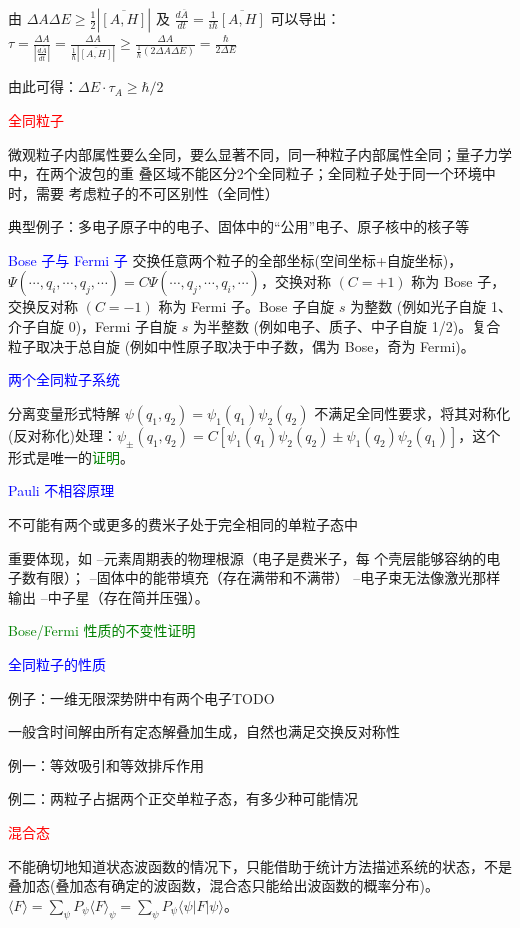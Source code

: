 \documentclass[a4paper,8pt]{extarticle} %
\newcommand{\bluetext}[1]{\textcolor{blue}{#1}}
\newcommand{\redtext}[1]{\textcolor{red}{#1}}
\newcommand{\greentext}[1]{\textcolor{green}{#1}}
\begin{document}
\begin{multicols}{3}
由 $\Delta A\Delta E \geq \frac{1}{2}|\overline{[A,H]}|$ 及 $\frac{d\overline{A}}{dt}=\frac{1}{i\hbar}\overline{[A,H]}$ 可以导出：
$\tau = \frac{\Delta A}{|\frac{d\overline{A}}{dt}|} = \frac{\Delta A}{\frac{1}{\hbar}|\overline{[A,H]}|} \geq \frac{\Delta A}{\frac{1}{\hbar}(2\Delta A\Delta E)} = \frac{\hbar}{2\Delta E}$

由此可得：$\Delta E \cdot \tau_A \geq \hbar/2$

\redtext{全同粒子}

微观粒子内部属性要么全同，要么显著不同，同一种粒子内部属性全同；量子力学中，在两个波包的重
叠区域不能区分2个全同粒子；全同粒子处于同一个环境中时，需要
考虑粒子的不可区别性（全同性）

典型例子：多电子原子中的电子、固体中的“公用”电子、原子核中的核子等

\bluetext{Bose 子与 Fermi 子}
交换任意两个粒子的全部坐标(空间坐标+自旋坐标)，$\Psi(\cdots,q_i,\cdots,q_j,\cdots)=C\Psi(\cdots,q_j,\cdots,q_i,\cdots)$，交换对称 $(C=+1)$ 称为 Bose 子，交换反对称 $(C=-1)$ 称为 Fermi 子。Bose 子自旋 $s$ 为整数 (例如光子自旋 1、介子自旋 0)，Fermi 子自旋 $s$ 为半整数 (例如电子、质子、中子自旋 1/2)。复合粒子取决于总自旋 (例如中性原子取决于中子数，偶为 Bose，奇为 Fermi)。

\bluetext{两个全同粒子系统}

分离变量形式特解 $\psi(q_1,q_2) = \psi_1(q_1)\psi_2(q_2)$ 不满足全同性要求，将其对称化(反对称化)处理：$\psi_{\pm}(q_1,q_2) = C[\psi_1(q_1)\psi_2(q_2) \pm \psi_1(q_2)\psi_2(q_1)]$，这个形式是唯一的\greentext{证明}。

\bluetext{Pauli 不相容原理}

不可能有两个或更多的费米子处于完全相同的单粒子态中

重要体现，如
–元素周期表的物理根源（电子是费米子，每
个壳层能够容纳的电子数有限）；
–固体中的能带填充（存在满带和不满带）
–电子束无法像激光那样输出
–中子星（存在简并压强）。

\greentext{Bose/Fermi 性质的不变性证明}

\bluetext{全同粒子的性质}

例子：一维无限深势阱中有两个电子TODO

一般含时间解由所有定态解叠加生成，自然也满足交换反对称性

例一：等效吸引和等效排斥作用

例二：两粒子占据两个正交单粒子态，有多少种可能情况

\redtext{混合态}

不能确切地知道状态波函数的情况下，只能借助于统计方法描述系统的状态，不是叠加态(叠加态有确定的波函数，混合态只能给出波函数的概率分布)。$\langle F \rangle = \sum_{\psi} P_{\psi}\langle F \rangle_{\psi} = \sum_{\psi} P_{\psi} \langle\psi| F |\psi\rangle$。


\end{multicols}
\end{document}

